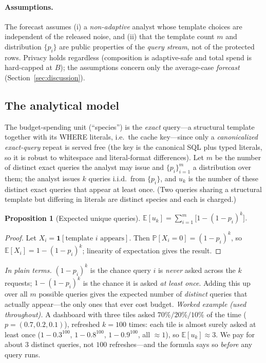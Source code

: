 \documentclass[sigconf,nonacm]{acmart}
\newcommand{\E}{\mathbb{E}}
\newcommand{\Prob}{\mathbb{P}}
\newtheorem{prop}{Proposition}
\begin{document}
\paragraph{Assumptions.}
The forecast assumes (i) a \emph{non-adaptive} analyst whose template choices are independent of the released noise, and (ii) that the template count $m$ and distribution $\{p_i\}$ are public properties of the \emph{query stream}, not of the protected rows. Privacy holds regardless (composition is adaptive-safe and total spend is hard-capped at $B$); the assumptions concern only the average-case \emph{forecast} (Section~\ref{sec:discussion}).

\subsection{The analytical model}
\label{sec:model}

The budget-spending unit (``species'') is the \emph{exact} query---a structural template together with its WHERE literals, i.e.\ the cache key---since only a \emph{canonicalized exact-query} repeat is served free (the key is the canonical SQL plus typed literals, so it is robust to whitespace and literal-format differences). Let $m$ be the number of distinct exact queries the analyst may issue and $\{p_i\}_{i=1}^m$ a distribution over them; the analyst issues $k$ queries i.i.d.\ from $\{p_i\}$, and $u_k$ is the number of these distinct exact queries that appear at least once. (Two queries sharing a structural template but differing in literals are distinct species and each is charged.)

\begin{prop}[Expected unique queries]
\label{prop:eu}
$\E[u_k]=\sum_{i=1}^m\bigl[1-(1-p_i)^k\bigr]$.
\end{prop}
\begin{proof}
Let $X_i=\mathbf 1[\text{template }i\text{ appears}]$. Then $\Prob[X_i=0]=(1-p_i)^k$, so $\E[X_i]=1-(1-p_i)^k$; linearity of expectation gives the result.
\end{proof}

\noindent\emph{In plain terms.} $(1-p_i)^k$ is the chance query $i$ is \emph{never} asked across the $k$ requests; $1-(1-p_i)^k$ is the chance it is asked \emph{at least once}. Adding this up over all $m$ possible queries gives the expected number of \emph{distinct} queries that actually appear---the only ones that ever cost budget. \emph{Worked example (used throughout).} A dashboard with three tiles asked $70\%/20\%/10\%$ of the time ($p{=}(0.7,0.2,0.1)$), refreshed $k{=}100$ times: each tile is almost surely asked at least once ($1-0.3^{100}$, $1-0.8^{100}$, $1-0.9^{100}$, all $\approx1$), so $\E[u_k]\approx3$. We pay for about $3$ distinct queries, not $100$ refreshes---and the formula says so \emph{before} any query runs.
\end{document}
